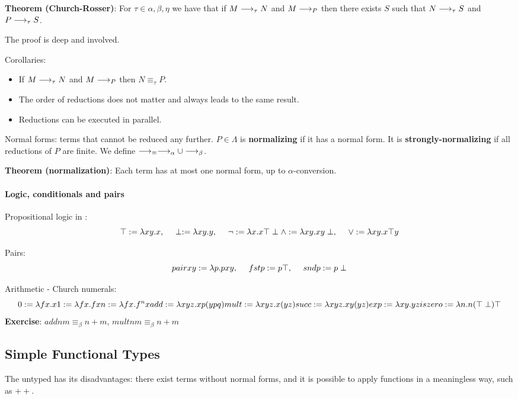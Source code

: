 \textbf{Theorem (Church-Rosser)}: For $\tau\in{\alpha, \beta, \eta}$ we have that if $M \longrightarrow_\tau N$ and $M \longrightarrow_P$ then
there exists $S$ such that $N \longrightarrow_\tau S$ and $P \longrightarrow_\tau S$.

The proof is deep and involved.

Corollaries:
\begin{itemize}
\item If $M \longrightarrow_\tau N$ and $M \longrightarrow_P$ then $N \equiv_\tau P$.
\item The order of reductions does not matter and always leads to the same result.
\item Reductions can be executed in parallel.
\end{itemize}

Normal forms: \lc terms that cannot be reduced any further. $P\in\Lambda$ is \textbf{normalizing} if it has a normal form. 
It is \textbf{strongly-normalizing} if all reductions of $P$ are finite. 
We define $\longrightarrow_\equiv \longrightarrow_\alpha \cup \longrightarrow_\beta$.

\textbf{Theorem (normalization)}: Each \lc term has at most one normal form, up to $\alpha$-conversion.

\paragraph{Logic, conditionals and pairs}

Propositional logic in \lc:
\[
\top := \lambda xy. x,~~~~\perp := \lambda xy.y,~~~~\neg := \lambda x. x \top \perp
\wedge := \lambda xy. xy\perp,~~~~\vee := \lambda xy. x\top y
\]

Pairs:
\[
pair x y := \lambda p. p x y,~~~~fst p := p \top,~~~~snd p := p \perp
\]

Arithmetic - Church numerals:
\[
0 := \lambda fx. x
1 := \lambda fx. fx
n := \lambda fx. f^n x
add := \lambda xyz. xp (ypq)
mult := \lambda xyz. x (yz)
succ := \lambda xyz. xy(yz)
exp := \lambda xy. yz
iszero := \lambda n. n (\top \perp) \top
\]
\textbf{Exercise}: $add n m \equiv_\beta n + m$, $mult n m \equiv_\beta n + m$

\subsection{Simple Functional Types}
The untyped \lc has its disadvantages: there exist terms without normal forms, and it is possible
to apply functions in a meaningless way, such as $+ +$. 


